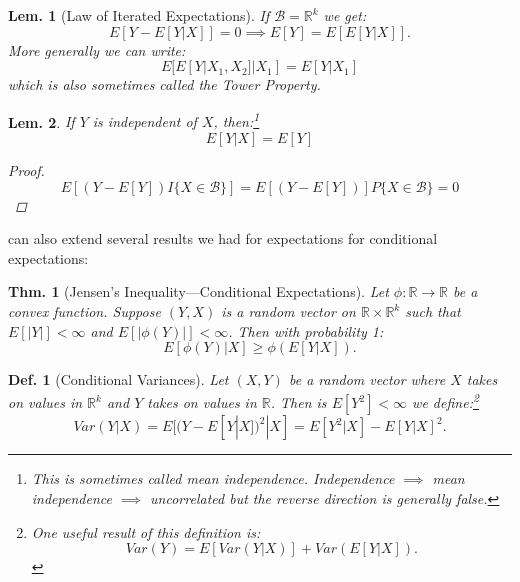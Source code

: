 \documentclass{tufte-book}
\theoremstyle{mytheoremstyle}
\newtheorem*{thm}{Thm.}
\theoremstyle{mylemstyle}
\newtheorem*{lem}{Lem.}
\theoremstyle{mydefstyle}
\newtheorem*{mydef}{Def.}
\begin{document}
\begin{lem}[Law of Iterated Expectations] If \(\mathcal{B} = \mathbb{R}^k\) we get:
			\[E[Y - E[Y|X]] = 0 \implies E[Y] = E[E[Y|X]] \text{.}\]
	More generally we can write:
			\[E[E[Y|X_1, X_2]| X_1] = E[Y | X_1]\]
which is also sometimes called the Tower Property.
\end{lem}
\begin{lem} If \(Y\) is independent of \(X\), then:\footnote{This is sometimes called \emph{mean independence}. Independence \(\implies\) mean independence \(\implies\) uncorrelated but the reverse direction is generally false.}
	\[E[Y |X] = E[Y]\]
	\begin{proof}
		\[E[(Y - E[Y])I\{X \in \mathcal{B}\}] = E[(Y - E[Y])]P\{X \in \mathcal{B}\} = 0\]
	\end{proof}
\end{lem}

 can also extend several results we had for expectations for conditional expectations:
\begin{thm}[Jensen's Inequality---Conditional Expectations] Let \(\phi:\mathbb{R} \rightarrow \mathbb{R}\) be a convex function. Suppose \((Y,X)\) is a random vector on \(\mathbb{R}\times\mathbb{R}^k\) such that \(E[|Y|] < \infty\) and \(E[|\phi(Y)|] < \infty\). Then with probability 1:
	\[E[\phi(Y)|X] \ge \phi(E[Y|X]) \text{.}\]
\end{thm}
\begin{mydef}[Conditional Variances] Let \((X,Y)\) be a random vector where \(X\) takes on values in \(\mathbb{R}^k\) and \(Y\) takes on values in \(\mathbb{R}\). Then is \(E[Y^2] < \infty\) we define:\footnote{One useful result of this definition is:
	\[Var(Y) = E[Var(Y|X)] + Var(E[Y|X])\text{.}\]}
	\[Var(Y|X) = E[(Y-E[Y|X])^2|X] = E[Y^2|X] - E[Y|X]^2 \text{.}\]
\end{mydef}
	
\end{document}
